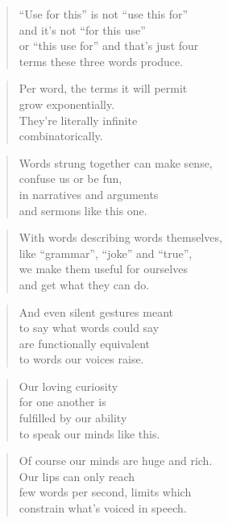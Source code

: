 \documentclass[14pt,a4paper]{article}
\begin{document}
\begin{verse}
“Use for this” is not “use this for”\\
and it’s not “for this use”\\
or “this use for” and that’s just four\\
terms these three words produce.
\end{verse}

\begin{verse}
Per word, the terms it will permit\\
grow exponentially.\\
They’re literally infinite\\
combinatorically.
\end{verse}

\begin{verse}
Words strung together can make sense,\\
confuse us or be fun,\\
in narratives and arguments\\
and sermons like this one.
\end{verse}

\begin{verse}
With words describing words themselves,\\
like “grammar”, “joke” and “true”,\\
we make them useful for ourselves\\
and get what they can do.
\end{verse}

\begin{verse}
And even silent gestures meant\\
to say what words could say\\
are functionally equivalent\\
to words our voices raise.
\end{verse}

\begin{verse}
Our loving curiosity\\
for one another is\\
fulfilled by our ability\\
to speak our minds like this.
\end{verse}

\begin{verse}
Of course our minds are huge and rich.\\
Our lips can only reach\\
few words per second, limits which\\
constrain what’s voiced in speech.
\end{verse}
\end{document}

